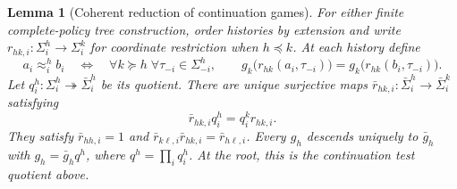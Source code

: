 \documentclass[11pt,a4paper]{article}
\numberwithin{equation}{section}
\newtheorem{lemma}[theorem]{Lemma}
\theoremstyle{definition}
\theoremstyle{remark}
\theoremstyle{plain}
\begin{document}
\begin{lemma}[Coherent reduction of continuation games]
\label{lem:egt-reduced-continuation-diagram}
For either finite complete-policy tree construction, order histories by
extension and write $r_{hk,i}:\Sigma_i^h\to\Sigma_i^k$ for coordinate
restriction when $h\preceq k$. At each history define
\[
 a_i\approx_i^h b_i
 \quad\Longleftrightarrow\quad
 \forall k\succeq h\;\forall\tau_{-i}\in\Sigma_{-i}^h,\qquad
 g_k\bigl(r_{hk}(a_i,\tau_{-i})\bigr)
 =g_k\bigl(r_{hk}(b_i,\tau_{-i})\bigr).
\]
Let $q_i^h:\Sigma_i^h\twoheadrightarrow\bar\Sigma_i^h$ be its quotient.
There are unique surjective maps
$\bar r_{hk,i}:\bar\Sigma_i^h\to\bar\Sigma_i^k$ satisfying
\begin{equation}
\label{eq:egt-reduced-continuation-square}
 \bar r_{hk,i}q_i^h=q_i^k r_{hk,i}.
\end{equation}
They satisfy $\bar r_{hh,i}=1$ and
$\bar r_{k\ell,i}\bar r_{hk,i}=\bar r_{h\ell,i}$. Every $g_h$ descends
uniquely to $\bar g_h$ with $g_h=\bar g_hq^h$, where $q^h=\prod_iq_i^h$.
At the root, this is the continuation test quotient above.
\end{lemma}
\end{document}
